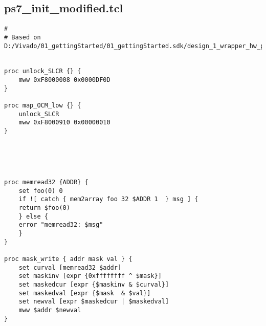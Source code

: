 \subsection{ps7\_init\_modified.tcl}
\label{anhang:ps7initmodified.tcl}
\lstset{language=tcl}
\begin{lstlisting}
# 
# Based on D:/Vivado/01_gettingStarted/01_gettingStarted.sdk/design_1_wrapper_hw_platform_0/ps7_init.tcl


proc unlock_SLCR {} {
	mww 0xF8000008 0x0000DF0D
}

proc map_OCM_low {} {
	unlock_SLCR
	mww 0xF8000910 0x00000010
}





proc memread32 {ADDR} {
    set foo(0) 0
    if ![ catch { mem2array foo 32 $ADDR 1  } msg ] {
	return $foo(0)
    } else {
	error "memread32: $msg"
    }
}

proc mask_write { addr mask val } {
	set curval [memread32 $addr]
	set maskinv [expr {0xffffffff ^ $mask}]
    set maskedcur [expr {$maskinv & $curval}]
	set maskedval [expr {$mask  & $val}]
    set newval [expr $maskedcur | $maskedval]
	mww $addr $newval
}


\end{lstlisting}
